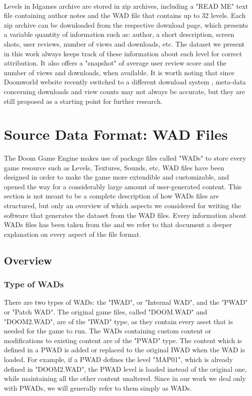 \paragraph{} Levels in Idgames archive are stored in zip archives, including a "READ ME" text file containing author notes and the \gls{WAD} file that contains up to 32 levels. 
Each zip archive can be downloaded from the respective download page, which presents a variable quantity of information such as: author, a short description, screen shots, user reviews, number of views and downloads, etc.
The dataset we present in this work always keeps track of these information about each level for correct attribution. It also offers a "snapshot" of average user review score and the number of views and downloads, when available. It is worth noting that since Doomworld website recently switched to a different download system \cite{wiki:doomworld}, meta-data concerning downloads and view counts may not always be accurate, but they are still proposed as a starting point for further research. 
\section{Source Data Format: WAD Files}
\label{sec:WAD} 
\paragraph{} The Doom Game Engine \cite{doomengine} makes use of package files called "\glspl{WAD}" to store every game resource such as Levels, Textures, Sounds, etc. 
\gls{WAD} files have been designed in order to make the game more extendible and customizable, and opened the way for a considerably large amount of user-generated content. This section is not meant to be a complete description of how \glspl{WAD} files are structured, but only an overview of which aspects we considered for writing the software that generates the dataset from the \gls{WAD} files. Every information about \glspl{WAD} files has been taken from the  \cite{doomspecs} and we refer to that document a deeper explanation on every aspect of the file format.
\subsection{Overview}
\subsubsection{Type of WADs}
There are two types of \glspl{WAD}: the "IWAD", or "Internal WAD", and the "PWAD" or "Patch WAD". The original game files, called "DOOM.WAD" and "DOOM2.WAD", are of the "IWAD" type, as they contain every asset that is needed for the game to run. The \glspl{WAD} containing custom content or modifications to existing content are of the "PWAD" type. The content which is defined in a PWAD is added or replaced to the original IWAD when the \gls{WAD} is loaded. For example, if a PWAD defines the level "MAP01", which is already defined in "DOOM2.WAD", the PWAD level is loaded instead of the original one, while maintaining all the other content unaltered.
Since in our work we deal only with PWADs, we will generally refer to them simply as \glspl{WAD}.

